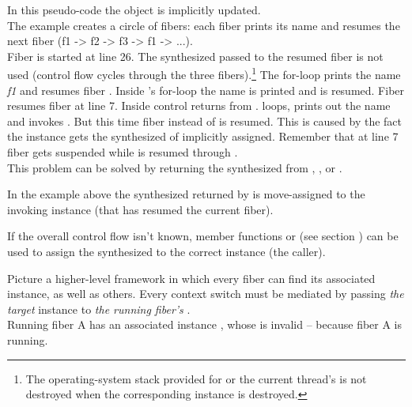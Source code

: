 In this pseudo-code the \fiber object is implicitly updated.\\
The example creates a circle of fibers: each fiber prints its name and resumes
the next fiber (f1 -> f2 -> f3 -> f1 -> ...).\\
Fiber  is started at line 26. The synthesized \fiber\xspace {} passed 
to the resumed fiber is not used (control flow cycles through the three
fibers).\footnote{The operating-system stack provided for \main or the current
thread's \entryfn\xspace is not destroyed when the corresponding \fiber instance is
destroyed.}
The for-loop prints the name \emph{f1} and resumes fiber . Inside 
's for-loop the name is printed and  is resumed. Fiber 
resumes fiber  at line 7. Inside  control returns from
.  loops, prints out the name and invokes . But
this time fiber  instead of  is resumed. This is caused by the
fact the instance  gets the synthesized \fiber of  implicitly
assigned. Remember that at line 7 fiber  gets suspended while 
is resumed through .\\

This problem can be solved by returning the synthesized \fiber from \resume,
\resumewith, \xtresume or \xtresumewith.

In the example above the synthesized \fiber returned by \resume is
move-assigned to the invoking \fiber instance (that has resumed the current
fiber).\\

\xspace\newline

If the overall control flow isn't known, member functions \resumewith
or \xtresumewith (see section ) can be used to assign the
synthesized \fiber to the correct \fiber instance (the caller).

Picture a higher-level framework in which every fiber can find its associated
 instance, as well as others. Every context switch must be mediated by
passing \emph{the target}  instance to \emph{the running fiber's}
.\\

Running fiber A has an associated  instance ,
whose \fiber {} is invalid -- because fiber A is running.\\

